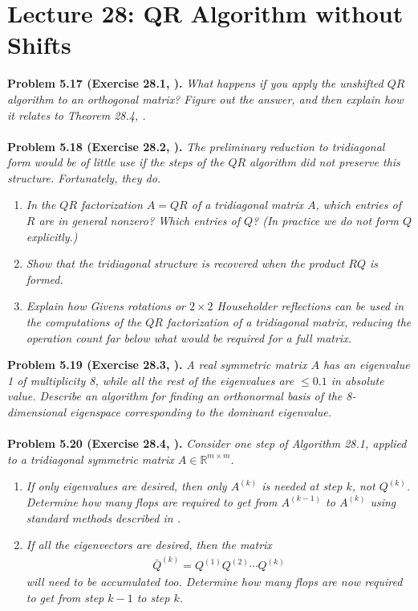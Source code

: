 \documentclass[a4paper,oneside]{book}
\numberwithin{equation}{chapter}
\begin{document}
\section{Lecture 28: QR Algorithm without Shifts}
\textbf{Problem 5.17 (Exercise 28.1, \cite{1}).} \textit{What happens if you apply the unshifted $QR$ algorithm to an orthogonal matrix? Figure out the answer, and then explain how it relates to Theorem 28.4, \cite{1}.}\\
\\
\textbf{Problem 5.18 (Exercise 28.2, \cite{1}).} \textit{The preliminary reduction to tridiagonal form would be of little use if the steps of the $QR$ algorithm did not preserve this structure. Fortunately, they do.}
\begin{enumerate}
\item \textit{In the $QR$ factorization $A=QR$ of a tridiagonal matrix $A$, which entries of $R$ are in general nonzero? Which entries of $Q$? (In practice we do not form $Q$ explicitly.)}
\item \textit{Show that the tridiagonal structure is recovered when the product $RQ$ is formed.}
\item \textit{Explain how Givens rotations or $2\times 2$ Householder reflections can be used in the computations of the $QR$ factorization of a tridiagonal matrix, reducing the operation count far below what would be required for a full matrix.}
\end{enumerate}
\textbf{Problem 5.19 (Exercise 28.3, \cite{1}).} \textit{A real symmetric matrix $A$ has an eigenvalue 1 of multiplicity 8, while all the rest of the eigenvalues are $\le 0.1$ in absolute value. Describe an algorithm for finding an orthonormal basis of the 8-dimensional eigenspace corresponding to the dominant eigenvalue.}\\
\\
\textbf{Problem 5.20 (Exercise 28.4, \cite{1}).} \textit{Consider one step of Algorithm 28.1, applied to a tridiagonal symmetric matrix $A\in \mathbb{R}^{m\times m}$.}
\begin{enumerate}
\item \textit{If only eigenvalues are desired, then only $A^{\left(k\right)}$ is needed at step $k$, not $Q^{\left(k\right)}$. Determine how many flops are required to get from $A^{\left(k-1\right)}$ to $A^{\left(k\right)}$ using standard methods described in \cite{1}.}
\item \textit{If all the eigenvectors are desired, then the matrix}
\begin{align}
{{\bar Q}^{\left( k \right)}} = {Q^{\left( 1 \right)}}{Q^{\left( 2 \right)}} \cdots {Q^{\left( k \right)}}
\end{align}
\textit{will need to be accumulated too. Determine how many flops are now required to get from step $k-1$ to step $k$.}
\end{enumerate}
\end{document}
